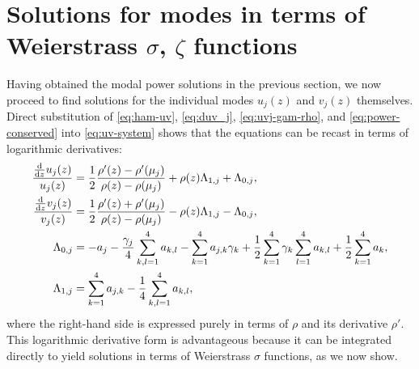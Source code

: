 \documentclass[11pt,a4paper]{article}
\numberwithin{equation}{section}
\begin{document}

\section{Solutions for modes in terms of Weierstrass \texorpdfstring{$\sigma$}{sigma}, \texorpdfstring{$\zeta$}{zeta} functions} \label{sec:mode-sols-u-v}

Having obtained the modal power solutions in the previous section, we now proceed to find solutions for the individual modes $u_j(z)$ and $v_j(z)$ themselves.
Direct substitution of \eqref{eq:ham-uv}, \eqref{eq:duv_j}, \eqref{eq:uvj-gam-rho}, and \eqref{eq:power-conserved} into \eqref{eq:uv-system} shows that the equations can be recast in terms of logarithmic derivatives:
\begin{align}
\frac{\frac{\mathrm{d}}{\mathrm{d}z} u_j{\left(z\right)}}{u_j{\left(z\right)}} &= \frac{1}{2}\frac{\rho'{\left(z \right)} - \rho'{\left({\mu}_{j} \right)}}{\rho{\left(z \right)} - \rho{\left({\mu}_{j} \right)}} + \rho{\left(z \right)} {\Lambda}_{1,j} + {\Lambda}_{0,j}, \notag \\
\frac{\frac{\mathrm{d}}{\mathrm{d}z} v_j{\left(z\right)}}{v_j{\left(z\right)}} &= \frac{1}{2}\frac{\rho'{\left(z \right)} + \rho'{\left({\mu}_{j} \right)}}{\rho{\left(z \right)} - \rho{\left({\mu}_{j} \right)}} - \rho{\left(z \right)} {\Lambda}_{1,j} - {\Lambda}_{0,j}, \label{eq:dlog-u-v-rho} \\
{\Lambda}_{0,j} &= - {a}_{j} - \frac{{\gamma}_{j}}{4} \sum\limits_{k,l=1}^{4} {a}_{k,l} - \sum_{k=1}^{4} {a}_{j,k} {\gamma}_{k} + \frac{1}{2}\sum_{k=1}^{4} {\gamma}_{k} \sum_{l=1}^{4} {a}_{k,l} + \frac{1}{2}\sum_{k=1}^{4} {a}_{k}, \\
{\Lambda}_{1,j} &= \sum_{k=1}^{4} {a}_{j,k} - \frac{1}{4}\sum\limits_{k,l=1}^{4}  {a}_{k,l},
\end{align}
where the right-hand side is expressed purely in terms of $\rho$ and its derivative $\rho'$.
This logarithmic derivative form is advantageous because it can be integrated directly to yield solutions in terms of Weierstrass $\sigma$ functions, as we now show.
\end{document}

